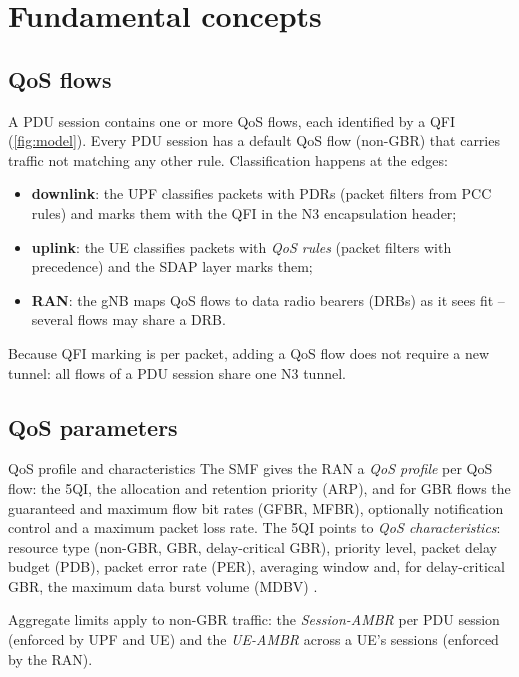 \documentclass[11pt,a4paper]{article}
\begin{document}
\section{Fundamental concepts}

\subsection{QoS flows}
A PDU session contains one or more QoS flows, each identified by a QFI (\cref{fig:model}). Every PDU session has a default QoS flow
(non-GBR) that carries traffic not matching any other rule. Classification happens at the edges:
\begin{itemize}
  \item \textbf{downlink}: the UPF classifies packets with PDRs (packet filters from PCC rules) and marks them with the QFI in the
        N3 encapsulation header;
  \item \textbf{uplink}: the UE classifies packets with \emph{QoS rules} (packet filters with precedence) and the SDAP layer marks them;
  \item \textbf{RAN}: the gNB maps QoS flows to data radio bearers (DRBs) as it sees fit -- several flows may share a DRB.
\end{itemize}
Because QFI marking is per packet, adding a QoS flow does not require a new tunnel: all flows of a PDU session share one N3 tunnel.

\begin{acnfigure}
  \caption{5G QoS model: classification in UE and UPF, QFI marking on N3, flow-to-DRB mapping by SDAP in the gNB.}
  \label{fig:model}
\end{acnfigure}

\subsection{QoS parameters}
\begin{definitionbox}{QoS profile and characteristics}
The SMF gives the RAN a \emph{QoS profile} per QoS flow: the 5QI, the allocation and retention priority (ARP), and for GBR flows the
guaranteed and maximum flow bit rates (GFBR, MFBR), optionally notification control and a maximum packet loss rate. The 5QI points to
\emph{QoS characteristics}: resource type (non-GBR, GBR, delay-critical GBR), priority level, packet delay budget (PDB), packet error rate
(PER), averaging window and, for delay-critical GBR, the maximum data burst volume (MDBV) \cite{ts23501}.
\end{definitionbox}
Aggregate limits apply to non-GBR traffic: the \emph{Session-AMBR} per PDU session (enforced by UPF and UE) and the \emph{UE-AMBR} across a
UE's sessions (enforced by the RAN).
\end{document}
